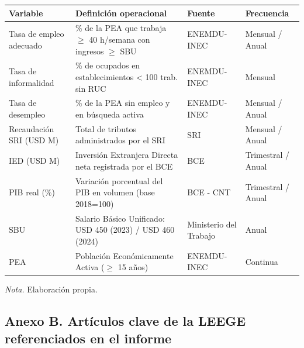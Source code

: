 \documentclass[12pt,spanish]{article}
\newcounter{none}
\begin{document}
{\def\LTcaptype{none} %
\begin{longtable}[]{@{}
  >{\raggedright\arraybackslash}p{}
  >{\raggedright\arraybackslash}p{}
  >{\raggedright\arraybackslash}p{}
  >{\raggedright\arraybackslash}p{}@{}}
\toprule\noalign{}
\begin{minipage}[b]{\linewidth}\raggedright
Variable
\end{minipage} & \begin{minipage}[b]{\linewidth}\raggedright
Definición operacional
\end{minipage} & \begin{minipage}[b]{\linewidth}\raggedright
Fuente
\end{minipage} & \begin{minipage}[b]{\linewidth}\raggedright
Frecuencia
\end{minipage} \\
\midrule\noalign{}
\endhead
\bottomrule\noalign{}
\endlastfoot
Tasa de empleo adecuado & \% de la PEA que trabaja \(\ge\) 40 h/semana
con ingresos \(\ge\) SBU & ENEMDU-INEC & Mensual / Anual \\
Tasa de informalidad & \% de ocupados en establecimientos \textless{}
100 trab. sin RUC & ENEMDU-INEC & Mensual \\
Tasa de desempleo & \% de la PEA sin empleo y en búsqueda activa &
ENEMDU-INEC & Mensual / Anual \\
Recaudación SRI (USD M) & Total de tributos administrados por el SRI &
SRI & Mensual / Anual \\
IED (USD M) & Inversión Extranjera Directa neta registrada por el BCE &
BCE & Trimestral / Anual \\
PIB real (\%) & Variación porcentual del PIB en volumen (base 2018=100)
& BCE - CNT & Trimestral / Anual \\
SBU & Salario Básico Unificado: USD 450 (2023) / USD 460 (2024) &
Ministerio del Trabajo & Anual \\
PEA & Población Económicamente Activa (\(\ge\) 15 años) & ENEMDU-INEC &
Continua \\
\end{longtable}
}

\emph{Nota.} Elaboración propia.

\subsection{Anexo B. Artículos clave de la LEEGE referenciados en el
informe}\label{anexo-b.-artuxedculos-clave-de-la-leege-referenciados-en-el-informe}
\end{document}
